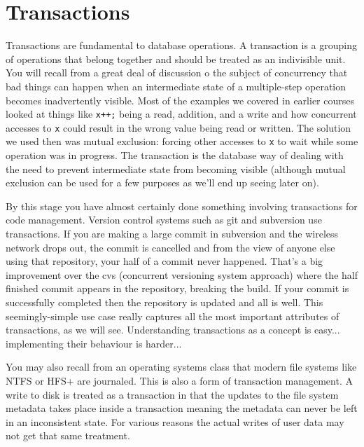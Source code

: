 




\section*{Transactions} 

Transactions are fundamental to database operations. A transaction is a grouping of operations that belong together and should be treated as an indivisible unit. You will recall from a great deal of discussion o the subject of concurrency that bad things can happen when an intermediate state of a multiple-step operation becomes inadvertently visible. Most of the examples we covered in earlier courses looked at things like \texttt{x++;} being a read, addition, and a write and how concurrent accesses to \texttt{x} could result in the wrong value being read or written. The solution we used then was mutual exclusion: forcing other accesses to \texttt{x} to wait while some operation was in progress. The transaction is the database way of dealing with the need to prevent intermediate state from becoming visible (although mutual exclusion can be used for a few purposes as we'll end up seeing later on).

By this stage you have almost certainly done something involving transactions for code management. Version control systems such as git and subversion use transactions. If you are making a large commit in subversion and the wireless network drops out, the commit is cancelled and from the view of anyone else using that repository, your half of a commit never happened. That's a big improvement over the cvs (concurrent versioning system approach) where the half finished commit appears in the repository, breaking the build. If your commit is successfully completed then the repository is updated and all is well. This seemingly-simple use case really captures all the most important attributes of transactions, as we will see. Understanding transactions as a concept is easy... implementing their behaviour is harder...

You may also recall from an operating systems class that modern file systems like NTFS or HFS+ are journaled. This is also a form of transaction management. A write to disk is treated as a transaction in that the updates to the file system metadata takes place inside a transaction meaning the metadata can never be left in an inconsistent state. For various reasons the actual writes of user data may not get that same treatment.

